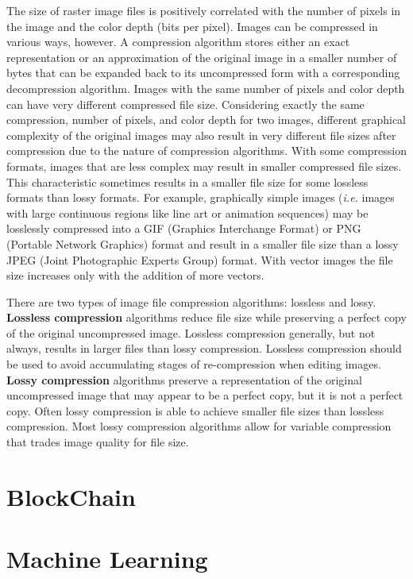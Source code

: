 The size of raster image files is positively correlated with the number of pixels in the image and the color depth (bits per pixel). Images can be compressed in various ways, however. A compression algorithm stores either an exact representation or an approximation of the original image in a smaller number of bytes that can be expanded back to its uncompressed form with a corresponding decompression algorithm. Images with the same number of pixels and color depth can have very different compressed file size. Considering exactly the same compression, number of pixels, and color depth for two images, different graphical complexity of the original images may also result in very different file sizes after compression due to the nature of compression algorithms. With some compression formats, images that are less complex may result in smaller compressed file sizes. This characteristic sometimes results in a smaller file size for some lossless formats than lossy formats. For example, graphically simple images (\textit{i.e.} images with large continuous regions like line art or animation sequences) may be losslessly compressed into a GIF (Graphics Interchange Format) or PNG (Portable Network Graphics) format and result in a smaller file size than a lossy JPEG (Joint Photographic Experts Group) format. With vector images the file size increases only with the addition of more vectors.

There are two types of image file compression algorithms: lossless and lossy.
\textbf{Lossless compression} algorithms reduce file size while preserving a perfect copy of the original uncompressed image. Lossless compression generally, but not always, results in larger files than lossy compression. Lossless compression should be used to avoid accumulating stages of re-compression when editing images.
\textbf{Lossy compression} algorithms preserve a representation of the original uncompressed image that may appear to be a perfect copy, but it is not a perfect copy. Often lossy compression is able to achieve smaller file sizes than lossless compression. Most lossy compression algorithms allow for variable compression that trades image quality for file size.

\section{BlockChain}
\label{sec:blockchain}


\section{Machine Learning}
\label{sec:mlearning}


